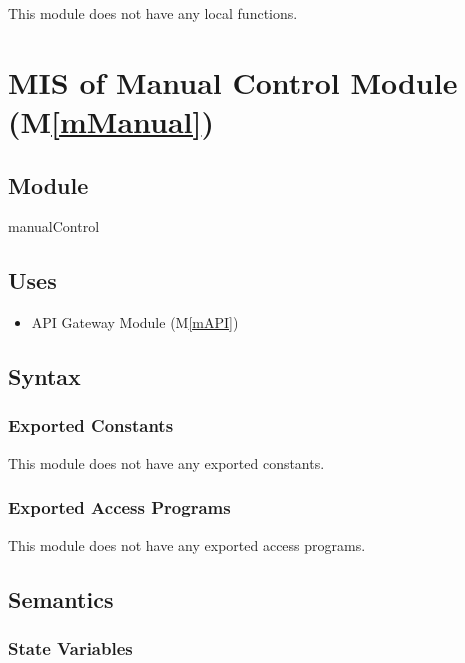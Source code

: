 \documentclass[12pt, titlepage]{article}
\newcommand{\mref}[1]{M\ref{#1}}
\begin{document}
This module does not have any local functions.

\section{MIS of Manual Control Module (\mref{mManual})}

\subsection{Module}

manualControl

\subsection{Uses}

\begin{itemize}
  \item API Gateway Module (\mref{mAPI})
\end{itemize}

\subsection{Syntax}

\subsubsection{Exported Constants}

This module does not have any exported constants.

\subsubsection{Exported Access Programs}

This module does not have any exported access programs.

\subsection{Semantics}

\subsubsection{State Variables}
\end{document}
